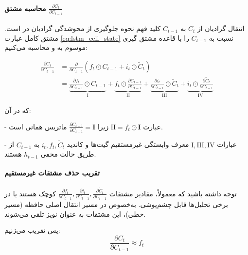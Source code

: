 \documentclass{article}
\begin{document}
\bigskip

\paragraph{محاسبه مشتق \(\frac{\partial C_t}{\partial C_{t-1}}\)}

انتقال گرادیان از \(C_t\) به \(C_{t-1}\) کلید فهم نحوه جلوگیری از محوشدگی گرادیان در  است. مشتق کامل عبارت \eqref{eq:lstm_cell_state} نسبت به \(C_{t-1}\) را با قاعده مشتق گیری موسوم به  ‌و  محاسبه می‌کنیم:

\begin{align}
	\frac{\partial C_t}{\partial C_{t-1}} 
	&= \frac{\partial}{\partial C_{t-1}} \left( f_t \odot C_{t-1} + i_t \odot \widetilde{C}_t \right) \\
	&= \underbrace{\frac{\partial f_t}{\partial C_{t-1}} \odot C_{t-1}}_{\text{I}} + \underbrace{f_t \odot \frac{\partial C_{t-1}}{\partial C_{t-1}}}_{\text{II}} + \underbrace{\frac{\partial i_t}{\partial C_{t-1}} \odot \widetilde{C}_t}_{\text{III}} + \underbrace{i_t \odot \frac{\partial \widetilde{C}_t}{\partial C_{t-1}}}_{\text{IV}} 
	\label{eq:full_derivative}
\end{align}

که در آن:

- عبارت \(\text{II} = f_t \odot \mathbf{I}\) زیرا \(\frac{\partial C_{t-1}}{\partial C_{t-1}} = \mathbf{I}\) ماتریس همانی است.

- عبارات \(\text{I}, \text{III}, \text{IV}\) معرف وابستگی غیرمستقیم گیت‌ها و کاندید \(i_t, f_t, \widetilde{C}_t\) به \(C_{t-1}\) از طریق حالت مخفی \(h_{t-1}\) هستند.



\paragraph{تقریب حذف مشتقات غیرمستقیم}

توجه داشته باشید که معمولاً، مقادیر مشتقات \(\frac{\partial f_t}{\partial C_{t-1}}, \frac{\partial i_t}{\partial C_{t-1}}, \frac{\partial \widetilde{C}_t}{\partial C_{t-1}}\) کوچک هستند یا در برخی تحلیل‌ها قابل چشم‌پوشی. به‌خصوص در مسیر انتقال اصلی حافظه (مسیر خطی)، این مشتقات به عنوان نویز تلقی می‌شوند.

پس تقریب می‌زنیم:
\begin{equation}
	\frac{\partial C_t}{\partial C_{t-1}} \approx f_t
	\label{eq:approx_derivative}
\end{equation}
\end{document}
